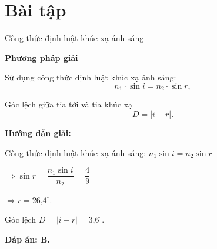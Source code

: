 \section{Bài tập }
\begin{dang}{Công thức định luật khúc xạ ánh sáng}
\end{dang}
\textbf{Phương pháp giải}

Sử dụng công thức định luật khúc xạ ánh sáng:
\begin{equation}
n_1\cdot \sin i=n_2\cdot \sin r,
\end{equation}

Góc lệch giữa tia tới và tia khúc xạ 
	\begin{equation}
		D=|i-r|.
	\end{equation} 

\vspace{1em}
{\begin{center}
	\textbf{Hướng dẫn giải:}
\end{center}

{Công thức định luật khúc xạ ánh sáng:
	$n_1\sin i=n_2\sin r$
	
	$\Rightarrow \sin r=\dfrac{n_1\sin i}{n_2}=\dfrac{4}{9}$
	
	$\Rightarrow r= \text{26,4}^\circ$.

Góc lệch $D=|i-r|=\text{3,6}^\circ$.

\textbf{	Đáp án: B.}
}
}

